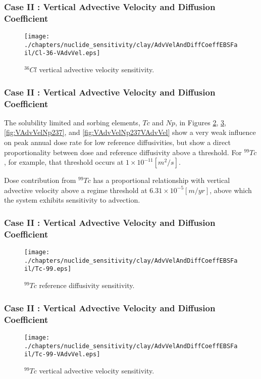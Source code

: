 \begin{frame}[c]
  \frametitle{Case II : Vertical Advective Velocity and Diffusion Coefficient}
\begin{figure}[ht!]
\centering
\texttt{[image: ./chapters/nuclide\_sensitivity/clay/AdvVelAndDiffCoeffEBSFail/Cl-36-VAdvVel.eps]}
\caption{$^{36}Cl$ vertical advective velocity sensitivity.}
\label{fig:VAdvVelCl36VAdvVel}
\end{figure}
\end{frame}

\begin{frame}[c]
  \frametitle{Case II : Vertical Advective Velocity and Diffusion Coefficient}
The solubility limited and sorbing elements, $Tc$ and $Np$, in Figures 
\ref{fig:VAdvVelTc99}, \ref{fig:VAdvVelTc99VAdvVel}, \ref{fig:VAdvVelNp237}, and 
\ref{fig:VAdvVelNp237VAdvVel} show a very weak influence on peak annual dose 
rate for low reference diffusivities, but show a direct proportionality between 
dose and reference diffusivity above a threshold. For $^{99}Tc$, for example, 
that threshold occurs at $1\times10^{-11}[m^2/s]$. 


Dose contribution from $^{99}Tc$ has a proportional 
relationship with vertical advective velocity above a regime threshold at 
$6.31\times10^{-5}[m/yr]$, above which the system exhibits sensitivity to 
advection. 


\begin{frame}[c]
  \frametitle{Case II : Vertical Advective Velocity and Diffusion Coefficient}
\begin{figure}[htp!]
\centering
\texttt{[image: ./chapters/nuclide\_sensitivity/clay/AdvVelAndDiffCoeffEBSFail/Tc-99.eps]}
\caption{$^{99}Tc$ reference diffusivity sensitivity.}
\label{fig:VAdvVelTc99}
\end{figure}
\end{frame}

\begin{frame}[c]
  \frametitle{Case II : Vertical Advective Velocity and Diffusion Coefficient}
\begin{figure}[ht!]
\centering
\texttt{[image: ./chapters/nuclide\_sensitivity/clay/AdvVelAndDiffCoeffEBSFail/Tc-99-VAdvVel.eps]}
\caption{$^{99}Tc$ vertical advective velocity sensitivity.}
\label{fig:VAdvVelTc99VAdvVel}
\end{figure}
\end{frame}



\end{frame}
